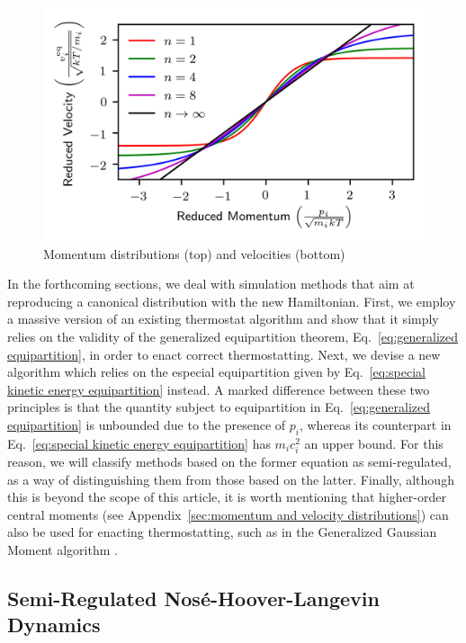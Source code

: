 \documentclass[
aip,
jcp,
reprint,
]{revtex4-1}
\newcommand{\figscale}{0.8}
\begin{document}
\begin{figure}[htbp!]
	\centering
	\includegraphics[scale=\figscale]{alternative_velocity_functions}
	\caption{Momentum distributions (top) and velocities (bottom)}
	\label{fig:alternative velocity functions}
\end{figure}

In the forthcoming sections, we deal with simulation methods that aim at reproducing a canonical distribution with the new Hamiltonian.
First, we employ a massive version of an existing thermostat algorithm and show that it simply relies on the validity of the generalized equipartition theorem, Eq.~\eqref{eq:generalized equipartition}, in order to enact correct thermostatting.
Next, we devise a new algorithm which relies on the especial equipartition given by Eq.~\eqref{eq:special kinetic energy equipartition} instead.
A marked difference between these two principles is that the quantity subject to equipartition in Eq.~\eqref{eq:generalized equipartition} is unbounded due to the presence of $p_i$, whereas its counterpart in Eq.~\eqref{eq:special kinetic energy equipartition} has $m_i c_i^2$ an upper bound.
For this reason, we will classify methods based on the former equation as semi-regulated, as a way of distinguishing them from those based on the latter.
Finally, although this is beyond the scope of this article, it is worth mentioning that higher-order central moments (see Appendix~\ref{sec:momentum and velocity distributions}) can also be used for enacting thermostatting, such as in the Generalized Gaussian Moment algorithm \cite{Liu_2000}.

\subsection{Semi-Regulated Nos\'{e}-Hoover-Langevin Dynamics}
\label{sec:semi-regulated massive NHL thermostatting}
\end{document}
